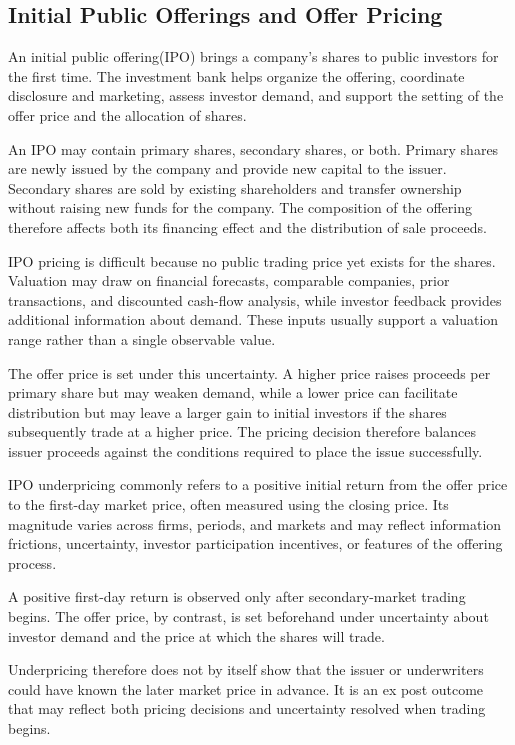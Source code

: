 \subsection{Initial Public Offerings and Offer Pricing}

An initial public offering(IPO) brings a company's shares to public investors for the first time. The investment bank helps organize the offering, coordinate disclosure and marketing, assess investor demand, and support the setting of the offer price and the allocation of shares.

An IPO may contain primary shares, secondary shares, or both. Primary shares are newly issued by the company and provide new capital to the issuer. Secondary shares are sold by existing shareholders and transfer ownership without raising new funds for the company. The composition of the offering therefore affects both its financing effect and the distribution of sale proceeds.

IPO pricing is difficult because no public trading price yet exists for the shares. Valuation may draw on financial forecasts, comparable companies, prior transactions, and discounted cash-flow analysis, while investor feedback provides additional information about demand. These inputs usually support a valuation range rather than a single observable value.

The offer price is set under this uncertainty. A higher price raises proceeds per primary share but may weaken demand, while a lower price can facilitate distribution but may leave a larger gain to initial investors if the shares subsequently trade at a higher price. The pricing decision therefore balances issuer proceeds against the conditions required to place the issue successfully.

IPO underpricing commonly refers to a positive initial return from the offer price to the first-day market price, often measured using the closing price. Its magnitude varies across firms, periods, and markets and may reflect information frictions, uncertainty, investor participation incentives, or features of the offering process.

\begin{tcolorbox}[
  enhanced,
  breakable,
  colback=white,
  colframe=FinanceBlue,
  boxrule=0.7pt,
  sharp corners,
  borderline west={2.2pt}{0pt}{FinanceBlue},
  title=\textbf{Financial Perspective: Underpricing Is an Ex Post Outcome},
  coltitle=white,
  colbacktitle=FinanceBlue,
  fonttitle=\bfseries,
  before skip=1.2em,
  after skip=1.2em
]

A positive first-day return is observed only after secondary-market trading begins. The offer price, by contrast, is set beforehand under uncertainty about investor demand and the price at which the shares will trade.

Underpricing therefore does not by itself show that the issuer or underwriters could have known the later market price in advance. It is an ex post outcome that may reflect both pricing decisions and uncertainty resolved when trading begins.

\end{tcolorbox}

